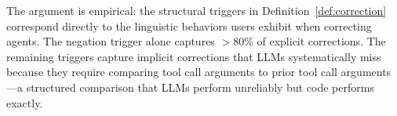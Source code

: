 The argument is empirical: the structural triggers in Definition~\ref{def:correction}
correspond directly to the linguistic behaviors users exhibit when correcting
agents. The negation trigger alone captures $>80\%$ of explicit corrections.
The remaining triggers capture implicit corrections that LLMs systematically
miss because they require comparing tool call arguments to prior tool call
arguments---a structured comparison that LLMs perform unreliably but code
performs exactly.

